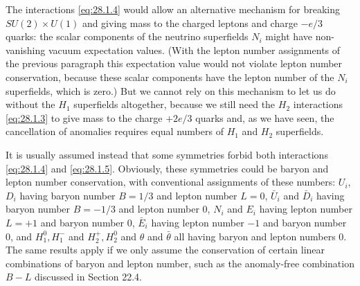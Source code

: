 The interactions \eqref{eq:28.1.4} would allow an alternative mechanism
for breaking \(SU(2)\times U(1)\) and giving mass to the charged
leptons and charge \(-e/3\) quarks: the scalar components of the neutrino
superfields \(N_i\) might have non-vanishing vacuum expectation values.
(With the lepton number assignments of the previous paragraph this
expectation value would not violate lepton number conservation, because
these scalar components have the lepton number of the \(N_i\)
superfields, which is zero.) But we cannot rely on this mechanism to let
us do without the \(H_1\) superfields altogether, because we still need
the \(H_2\) interactions \eqref{eq:28.1.3} to give mass to the charge
\(+2e/3\) quarks and, as we have seen, the cancellation of anomalies
requires equal numbers of \(H_1\) and \(H_2\) superfields.

It is usually assumed instead that some symmetries forbid both
interactions \eqref{eq:28.1.4} and \eqref{eq:28.1.5}. Obviously, these
symmetries could be baryon and lepton number conservation, with
conventional assignments of these numbers: \(U_i\), \(D_i\) having
baryon number \(B=1/3\) and lepton number \(L=0\), \(\bar U_i\) and
\(\bar D_i\) having baryon number \(B=-1/3\) and lepton number 0,
\(N_i\) and \(E_i\) having lepton number \(L=+1\) and baryon number 0,
\(\bar E_i\) having lepton number \(-1\) and baryon number 0, and
\(H_1^0,H_1^-\) and \(H_2^+,H_2^0\) and \(\theta\) and \(\bar\theta\)
all having baryon and lepton numbers 0. The same results apply if we
only assume the conservation of certain linear combinations of baryon
and lepton number, such as the anomaly-free combination \(B-L\)
discussed in Section 22.4.

